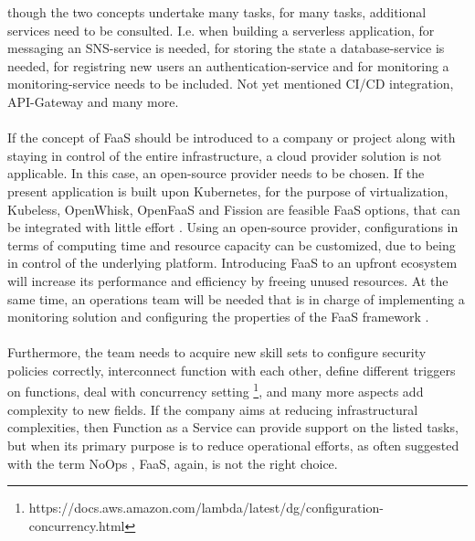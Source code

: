 \documentclass[a4paper,11pt, pagesize]{scrartcl}
\begin{document}
\begin{spacing}{1.2}
though the two concepts undertake many tasks, for many tasks, additional services need to be consulted. I.e. when building a serverless application, for messaging an SNS-service is needed, for storing the state a database-service is needed, for registring new users an authentication-service and for monitoring a monitoring-service needs to be included. Not yet mentioned CI/CD integration, API-Gateway and many more.\\\\ If the concept of FaaS should be introduced to a company or project along with staying in control of the entire infrastructure, a cloud provider solution is not applicable. In this case, an open-source provider needs to be chosen. If the present application is built upon Kubernetes, for the purpose of virtualization, Kubeless, OpenWhisk, OpenFaaS and Fission are feasible FaaS options, that can be integrated with little effort \cite{palade2019evaluation}. Using an open-source provider, configurations in terms of computing time and resource capacity can be customized, due to being in control of the underlying platform. Introducing FaaS to an upfront ecosystem will increase its performance and efficiency by freeing unused resources. At the same time, an operations team will be needed that is in charge of implementing a monitoring solution and configuring the properties of the FaaS framework \cite{mohanty2018evaluation}.\\\\ Furthermore, the team needs to acquire new skill sets to configure security policies correctly, interconnect function with each other, define different triggers on functions, deal with concurrency setting \footnote{https://docs.aws.amazon.com/lambda/latest/dg/configuration-concurrency.html}, and many more aspects add complexity to new fields. If the company aims at reducing infrastructural complexities, then Function as a Service can provide support on the listed tasks, but when its primary purpose is to reduce operational efforts, as often suggested with the term \glqq NoOps\grqq{} \cite{eivy2017wary}, FaaS, again, is not the right choice.

\end{spacing}
\end{document}
